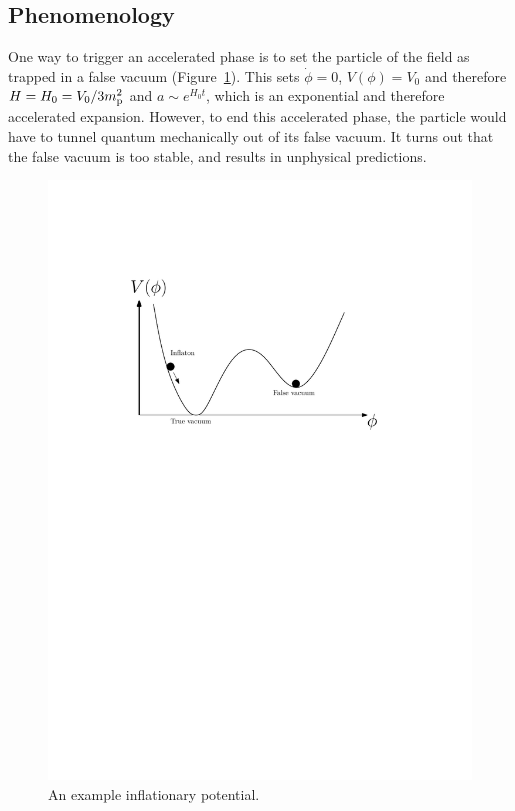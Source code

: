 \subsection{Phenomenology}
One way to trigger an accelerated phase is to set the particle of the field as trapped in a false vacuum (Figure~\ref{fig:cos:potential}). This sets \(\dot{\phi}=0\), \(V(\phi)=V_0\) and therefore \(H=H_0=V_0/3m_{\mathrm{p}}^2\) and \(a\sim e^{H_0t}\), which is an exponential and therefore accelerated expansion. However, to end this accelerated phase, the particle would have to tunnel quantum mechanically out of its false vacuum. It turns out that the false vacuum is too stable, and results in unphysical predictions.

\begin{figure}[tp]
  \centering
  \includegraphics[width=\textwidth]{chapters/inflationary_cosmology/figures/potential}
  \caption{An example inflationary potential.}\label{fig:cos:potential}
\end{figure}

